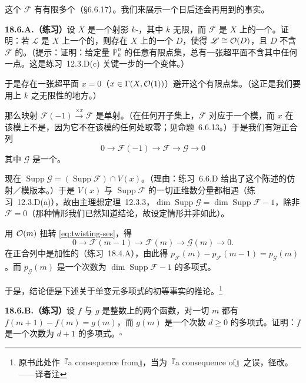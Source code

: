 这个\trCoherentSheaf{} $\mathscr{F}$ 有有限多个\trAssociatedPoint（\S6.6.17）。我们来展示一个日后还会再用到的事实。

\textbf{18.6.A.（练习）}\quad 设 $X$ 是一个射影 $k$-\trScheme{}，其中 $k$ 无限，而 $\mathscr{F}$ 是 $X$ 上的一个\trCoherentSheaf。证明：若 $\mathscr{L}$ 是 $X$ 上一个\trVeryAmple{}的\trInvertibleSheaf，则存在 $X$ 上的一个\trEffectiveCartierDivisor{} $D$，使得 $\mathscr{L}\cong\mathcal{O}(D)$，且 $D$ 不含 $\mathscr{F}$ 的\trAssociatedPoint{}。（提示：证明：给定量 $\mathbb{P}^n_k$ 的任意有限点集，总有一张超平面不含其中任何一点。这是\mbox{练习~12.3.D(c)} 关键一步的一个变体。）

于是存在一张超平面 $x=0$（$x\in\Gamma(X,\mathcal{O}(1))$）避开这个有限点集。（这正是我们要用上 $k$ 之无限性的地方。）

那么映射 $\mathscr{F}(-1)\xrightarrow{\times x}\mathscr{F}$ 是单射。（在任何\trAffine{}开子集上，$\mathscr{F}$ 对应于一个模，而 $x$ 在该模上不是\trZerodivisor，因为它不在该模的任何\trAssociatedPoint{}处取零；见\mbox{命题~6.6.13}。）于是我们有短正合列
\begin{equation*}\tag{18.6.3.1}\label{eq:twisting-ses}
0\longrightarrow\mathscr{F}(-1)\longrightarrow\mathscr{F}\longrightarrow\mathscr{G}\longrightarrow 0
\end{equation*}
其中 $\mathscr{G}$ 是一个\trCoherentSheaf。

现在 $\operatorname{Supp}\mathscr{G}=(\operatorname{Supp}\mathscr{F})\cap V(x)$。（理由：\mbox{练习~6.6.D} 给出了这个陈述的仿射／模版本。）于是 $V(x)$ 与 $\operatorname{Supp}\mathscr{F}$ 的一切正维数分量都相遇（\mbox{练习~12.3.D(a)}），故由\trKrull{}主理想定理~\mbox{12.3.3}，$\dim\operatorname{Supp}\mathscr{G}=\dim\operatorname{Supp}\mathscr{F}-1$，除非 $\mathscr{F}=0$（那种情形我们已然知道结论，故设定情形并非如此）。

用 $\mathcal{O}(m)$ 扭转 \eqref{eq:twisting-ses}，得
\[
0\longrightarrow\mathscr{F}(m-1)\longrightarrow\mathscr{F}(m)\longrightarrow\mathscr{G}(m)\longrightarrow 0.
\]
\trEulerCharacteristic{}在正合列中是加性的（\mbox{练习~18.4.A}），由此得 $p_{\mathscr{F}}(m)-p_{\mathscr{F}}(m-1)=p_{\mathscr{G}}(m)$。而 $p_{\mathscr{G}}(m)$ 是一个次数为 $\dim\operatorname{Supp}\mathscr{F}-1$ 的多项式。

于是，结论便是下述关于单变元多项式的初等事实的推论。\footnote{原书此处作『a consequence from』，当为『a consequence of』之误，径改。——译者注}

\textbf{18.6.B.（练习）}\quad 设 $f$ 与 $g$ 是整数上的两个函数，对一切 $m$ 都有 $f(m+1)-f(m)=g(m)$，而 $g(m)$ 是一个次数 $d\ge 0$ 的多项式。证明：$f$ 是一个次数为 $d+1$ 的多项式。\hfill$\square$

